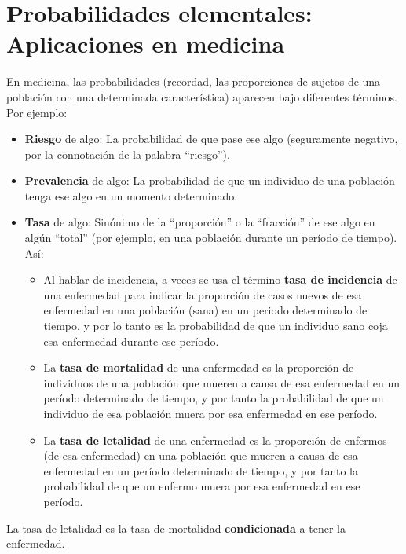 \documentclass[
]{book}
\theoremstyle{definition}
\theoremstyle{definition}
\theoremstyle{definition}
\theoremstyle{definition}
\theoremstyle{remark}
\begin{document}
\hypertarget{probabilidades-elementales-aplicaciones-en-medicina}{%
\chapter{Probabilidades elementales: Aplicaciones en medicina}\label{probabilidades-elementales-aplicaciones-en-medicina}}

En medicina, las probabilidades (recordad, las proporciones de sujetos de una población con una determinada característica) aparecen bajo diferentes términos. Por ejemplo:

\begin{itemize}
\item
  \textbf{Riesgo} de algo: La probabilidad de que pase ese algo (seguramente negativo, por la connotación de la palabra ``riesgo'').
\item
  \textbf{Prevalencia} de algo: La probabilidad de que un individuo de una población tenga ese algo en un momento determinado.
\item
  \textbf{Tasa} de algo: Sinónimo de la ``proporción'' o la ``fracción'' de ese algo en algún ``total'' (por ejemplo, en una población durante un período de tiempo). Así:

  \begin{itemize}
  \item
    Al hablar de incidencia, a veces se usa el término \textbf{tasa de incidencia} de una enfermedad para indicar la proporción de casos nuevos de esa enfermedad en una población (sana) en un periodo determinado de tiempo, y por lo tanto es la probabilidad de que un individuo sano coja esa enfermedad durante ese período.
  \item
    La \textbf{tasa de mortalidad} de una enfermedad es la proporción de individuos de una población que mueren a causa de esa enfermedad en un período determinado de tiempo, y por tanto la probabilidad de que un individuo de esa población muera por esa enfermedad en ese período.
  \item
    La \textbf{tasa de letalidad} de una enfermedad es la proporción de enfermos (de esa enfermedad) en una población que mueren a causa de esa enfermedad en un período determinado de tiempo, y por tanto la probabilidad de que un enfermo muera por esa enfermedad en ese período.
  \end{itemize}
\end{itemize}

\begin{rmdnote}
La tasa de letalidad es la tasa de mortalidad \textbf{condicionada} a tener la enfermedad.
\end{rmdnote}
\end{document}
